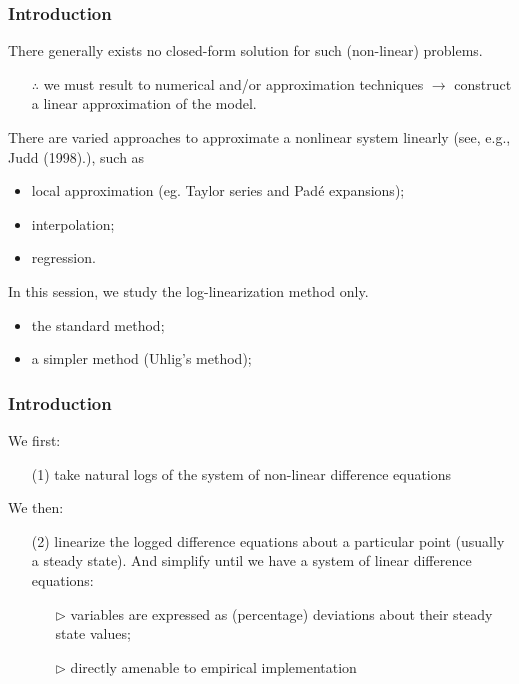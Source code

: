 \documentclass[10pt, handout]{beamer}
\begin{document}
\begin{frame}

\frametitle{Introduction} \vskip 0.1in

There generally exists no closed-form solution for such (non-linear) problems.
\begin{itemize}
\item[$\therefore$] we must result to numerical and/or approximation techniques $\rightarrow$ construct a linear approximation of the model.
\end{itemize}\vskip 0.1in

{{There are varied approaches to approximate a nonlinear system
linearly {(\footnotesize{see, e.g., Judd (1998).)}}, such as
\begin{itemize}
\item local approximation (eg. Taylor series and Pad{\'{e}}
expansions);
\item interpolation;
\item regression.
\end{itemize}}}\vskip 0.1in

In this session, we study the log-linearization method only.
\begin{itemize}
  \item the standard method;
  \item a simpler method (Uhlig's method);
\end{itemize}

\end{frame}


\begin{frame}

\frametitle{Introduction} \vskip 0.1in

We first:\vskip 0.05in
\begin{enumerate}
\item[(1)] take natural logs of the system of non-linear difference equations
\end{enumerate}\vskip 0.1in

We then:\vskip 0.05in
\begin{enumerate}
\item[(2)] linearize the logged difference equations about a particular point (usually a steady state). And simplify until we have a system of linear difference equations:\vskip 0.05in
    \begin{enumerate}
    \item[$\triangleright$] variables are expressed as (percentage) deviations about their steady state values;\vskip 0.05in
    \item[$\triangleright$] directly amenable to empirical implementation
    \end{enumerate}
\end{enumerate}

\end{frame}
\end{document}
